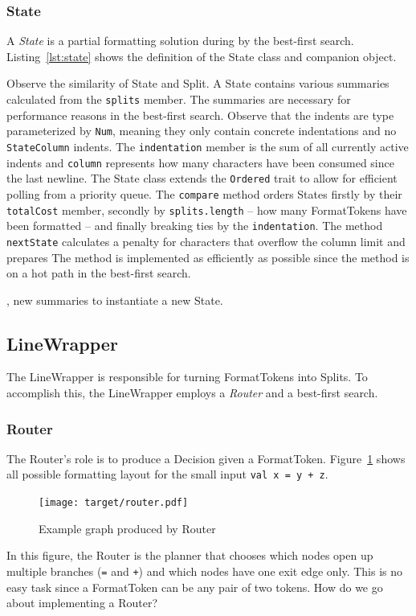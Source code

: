 \subsubsection{State}
A \emph{State} is a partial formatting solution during by the best-first search.
Listing~\ref{lst:state} shows the definition of the State class and companion object.
\begin{minipage}{\linewidth}
  
\end{minipage}
Observe the similarity of State and Split.
A State contains various summaries calculated from the \texttt{splits} member.
The summaries are necessary for performance reasons in the best-first search.
Observe that the indents are type parameterized by \texttt{Num}, meaning they only contain concrete indentations and no \texttt{StateColumn} indents.
The \texttt{indentation} member is the sum of all currently active indents and \texttt{column} represents how many characters have been consumed since the last newline.
The State class extends the \texttt{Ordered} trait to allow for efficient polling from a priority queue.
The \texttt{compare} method orders States firstly by their \texttt{totalCost} member, secondly by \texttt{splits.length} -- how many FormatTokens have been formatted -- and finally breaking ties by the \texttt{indentation}.
The method \texttt{nextState} calculates a penalty for characters that overflow the column limit and prepares
The method is implemented as efficiently as possible since the method is on a hot path in the best-first search.

, new summaries to instantiate a new State.
\subsection{LineWrapper}
The LineWrapper is responsible for turning FormatTokens into Splits.
To accomplish this, the LineWrapper employs a \emph{Router} and a best-first search.

\subsubsection{Router}\label{sec:router}
The Router's role is to produce a Decision given a FormatToken.
Figure~\ref{fig:router} shows all possible formatting layout for the small input \texttt{val x = y + z}.
\begin{figure}
  \centering
  \texttt{[image: target/router.pdf]}
  \caption{Example graph produced by Router}
  \label{fig:router}
\end{figure}
In this figure, the Router is the planner that chooses which nodes open up multiple branches (\texttt{=} and \texttt{+}) and which nodes have one exit edge only.
This is no easy task since a FormatToken can be any pair of two tokens.
How do we go about implementing a Router?

